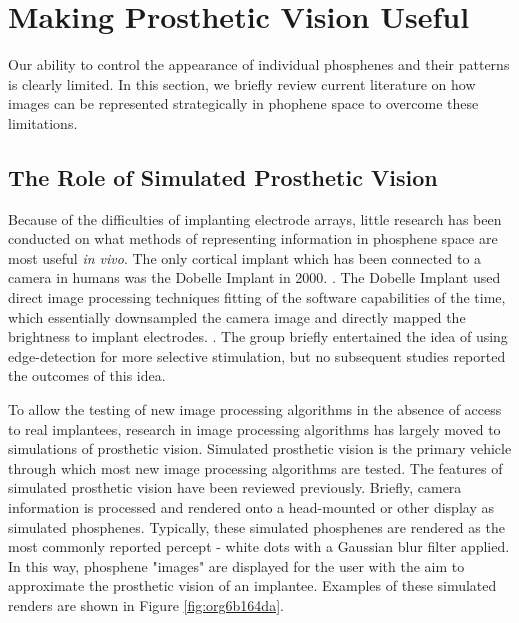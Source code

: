 \documentclass[a4paper,11pt,openany]{book}
\begin{document}
\clearpage

\chapter{Making Prosthetic Vision Useful}
\label{sec:org9339291}
\label{org323c9e6}

Our ability to control the appearance of individual phosphenes and their patterns is clearly limited.
In this section, we briefly review current literature on how images can be represented strategically in phophene space to overcome these limitations.

\section*{The Role of Simulated Prosthetic Vision}
\label{sec:org48b6b81}

Because of the difficulties of implanting electrode arrays, little research has been conducted on what methods of representing information in phosphene space are most useful \emph{in vivo}.
The only cortical implant which has been connected to a camera in humans was the Dobelle Implant in 2000. \cite{dobelle_artificial_2000}.
The Dobelle Implant used direct image processing techniques fitting of the software capabilities of the time, which essentially downsampled the camera image and directly mapped the brightness to implant electrodes. \cite{dobelle_artificial_2000}.
The group briefly entertained the idea of using edge-detection for more selective stimulation, but no subsequent studies reported the outcomes of this idea.

To allow the testing of new image processing algorithms in the absence of access to real implantees, research in image processing algorithms has largely moved to simulations of prosthetic vision. \cite{chen_simulating_2009-1,chen_simulating_2009}
Simulated prosthetic vision is the primary vehicle through which most new image processing algorithms are tested.
The features of simulated prosthetic vision have been reviewed previously. \cite{chen_simulating_2009-1}
Briefly, camera information is processed and rendered onto a head-mounted or other display as simulated phosphenes.
Typically, these simulated phosphenes are rendered as the most commonly reported percept - white dots with a Gaussian blur filter applied. \cite{chen_simulating_2009-1}
In this way, phosphene "images" are displayed for the user with the aim to approximate the prosthetic vision of an implantee.
Examples of these simulated renders are shown in Figure \ref{fig:org6b164da}.
\end{document}
